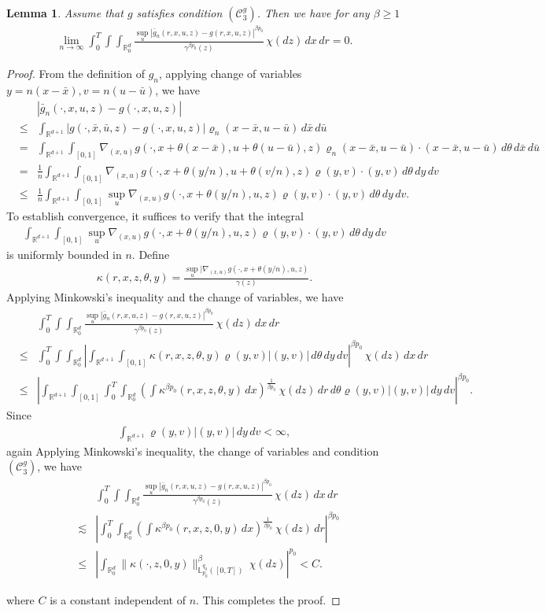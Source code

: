 \documentclass[12pt,oneside, reqno]{amsart}
\newcommand{\ce}{\begin{eqnarray*}}
\newcommand{\de}{\end{eqnarray*}}
\newtheorem{lemma}[theorem]{Lemma}
\def\mL{{\mathbb L}}
\def\mR{{\mathbb R}}
\def\sC{{\mathscr C}}
\def\geq{\geqslant}
\def\leq{\leqslant}
\numberwithin{equation}{section}
\begin{document}
\begin{lemma}\label{molifier-ap1}
	Assume that $g$ satisfies condition $(\sC_3^g)$. Then we have for any $\beta\geq 1$
		\ce 
	\lim_{n\to \infty}\int_0^T\int\int_{\mR^d_0}\frac{\sup_u|\bar{g}_n(r,x,u,z)-g(r,x,u,z)|^{\beta p_0}}{\gamma^{\beta p_0}(z)}\,\chi(dz)\,dx\,dr= 0.
	\de 
\end{lemma}
\begin{proof}
	
  From the definition of  $g_n$,  applying change of variables $y=n(x-\bar{x}), v=n(u-\bar{u})$, we have 
	\ce 
	&&|\bar g_n(\cdot,x,u,z)-g(\cdot,x,u,z)|\\
	&\leq &\int_{\mR^{d+1}} |g(\cdot,\bar{x},\bar{u},z)-g(\cdot,x,u,z)|\varrho_n(x-\bar{x},u-\bar{u})\,d\bar{x}\,d\bar{u}\\
	&=&\int_{\mR^{d+1}} \int_{[0,1]}\nabla_{(x,u)}g(\cdot, x+\theta(x-\bar{x}), u+\theta(u-\bar{u}),z)\varrho_n(x-\bar{x},u-\bar{u})\cdot(x-\bar{x},u-\bar{u})\,d\theta\,d\bar{x}\,d\bar{u}\\
	&=&\frac{1}{n}\int_{\mR^{d+1}} \int_{[0,1]}\nabla_{(x,u)}g(\cdot, x+\theta(y/n), u+\theta(v/n),z)\varrho(y,v)\cdot(y,v)\,d\theta\,dy\,dv\\
	&\leq &\frac{1}{n}\int_{\mR^{d+1}} \int_{[0,1]}\sup_u\nabla_{(x,u)}g(\cdot, x+\theta(y/n), u,z)\varrho(y,v)\cdot(y,v)\,d\theta\,dy\,dv.
	\de 
To establish convergence, it suffices to verify that the integral
	\ce 
	\int_{\mR^{d+1}} \int_{[0,1]}\sup_u\nabla_{(x,u)}g(\cdot, x+\theta(y/n), u,z)\varrho(y,v)\cdot(y,v)\,d\theta\,dy\,dv
	\de 
	is uniformly bounded in $n$.	Define
	\ce 
	\kappa(r,x,z,\theta,y)=\frac{\sup_u|\nabla_{(x,u)}g(\cdot, x+\theta(y/n),u,z)}{\gamma(z)}.
	\de 
Applying Minkowski’s inequality and the change of variables, we have 
\ce 
&&\int_0^T\int\int_{\mR^d_0}\frac{\sup_u|\bar{g}_n(r,x,u,z)-g(r,x,u,z)|^{\beta p_0}}{\gamma^{\beta p_0}(z)}\,\chi(dz)\,dx\,dr\\
&\leq&\int_0^T\int\int_{\mR^d_0}\left|\int_{\mR^{d+1}} \int_{[0,1]}\kappa(r,x,z,\theta,y)\varrho(y,v)|(y,v)|\,d\theta\,dy\,dv\right|^{\beta p_0}\,\chi(dz)\,dx\,dr\\
&\leq&\left|\int_{\mR^{d+1}} \int_{[0,1]}\int_0^T\int_{\mR^d_0}\left(\int\kappa^{\beta p_0}(r,x,z,\theta,y)\,dx\right)^{\frac{1}{\beta p_0}}\,\chi(dz)\,dr\,d\theta\varrho(y,v)|(y,v)|\,dy\,dv\right|^{\beta p_0}.
\de 
Since 
\ce 
\int_{\mR^{d+1}}\varrho(y,v)|(y,v)|\,dy\,dv<\infty,
\de 
again Applying Minkowski’s inequality, the change of variables and condition $(\sC_3^g)$, we have 
\ce 
&&\int_0^T\int\int_{\mR^d_0}\frac{\sup_u|\bar{g}_n(r,x,u,z)-g(r,x,u,z)|^{\beta p_0}}{\gamma^{\beta p_0}(z)}\,\chi(dz)\,dx\,dr\\
&\lesssim&\left|\int_0^T\int_{\mR^d_0}\left(\int\kappa^{\beta p_0}(r,x,z,0,y)\,dx\right)^{\frac{1}{\beta p_0}}\,\chi(dz)\,dr\right|^{\beta p_0}\\
&\leq&\left|\int_{\mR^d_0}\|\kappa(\cdot,z,0,y)\|_{\mL_{p_0}^{q_0}([0,T])}^{\beta}\,\chi(dz)\right|^{ p_0}<C.
\de 

where $C$ is a constant independent of $n$.  This completes the proof. 
\end{proof}
\end{document}
